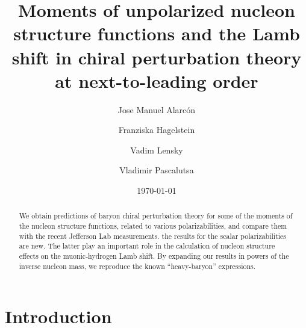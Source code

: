 \documentclass[11pt,preprint,tightenlines,
showpacs,preprintnumbers,amsmath,amssymb,superscriptaddress,a4paper,nofootinbib]{revtex4-1}
\begin{document}
\title {Moments of unpolarized nucleon structure functions
and the Lamb shift in chiral perturbation theory at next-to-leading order}
\author{Jose Manuel Alarc\'on}
\author{Franziska Hagelstein}
\author{Vadim Lensky}
\author{Vladimir Pascalutsa}

\begin{abstract}
We obtain predictions of baryon chiral perturbation theory for some of the moments of the nucleon structure functions, related to various polarizabilities, and compare them with the recent Jefferson Lab measurements. 
 the results
for the scalar polarizabilities are new. The latter play an
important role in the calculation of nucleon structure 
effects on the muonic-hydrogen Lamb shift. 
By expanding our results in powers of the inverse nucleon  mass,
we reproduce the known ``heavy-baryon'' expressions. 

\end{abstract}
\date{\today}
\maketitle

\tableofcontents

\newpage
\section{Introduction}
\end{document}
